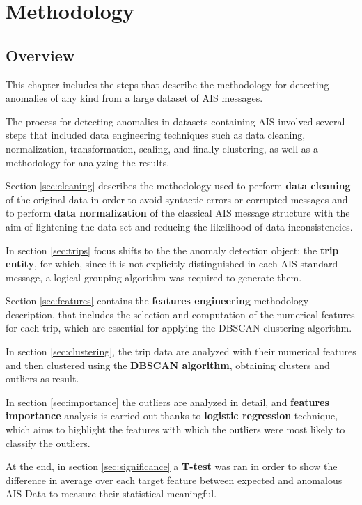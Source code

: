 \chapter{Methodology}
\label{ch:methodology}

\section{Overview}

This chapter includes the steps that describe the methodology for detecting anomalies of any kind from a large dataset of AIS messages.

The process for detecting anomalies in datasets containing AIS involved several steps that included data engineering techniques such as data cleaning, normalization, transformation, scaling, and finally clustering, as well as a methodology for analyzing the results.

Section \ref{sec:cleaning} describes the methodology used to perform \textbf{data cleaning} of the original data in order to avoid syntactic errors or corrupted messages and to perform \textbf{data normalization} of the classical AIS message structure with the aim of lightening the data set and reducing the likelihood of data inconsistencies.

In section \ref{sec:trips} focus shifts to the the anomaly detection object: the \textbf{trip entity}, for which, since it is not explicitly distinguished in each AIS standard message, a logical-grouping algorithm was required to generate them.

Section \ref{sec:features} contains the \textbf{features engineering} methodology description, that includes the selection and computation of the numerical features for each trip, which are essential for applying the DBSCAN clustering algorithm.

In section \ref{sec:clustering}, the trip data are analyzed with their numerical features and then clustered using the \textbf{DBSCAN algorithm}, obtaining clusters and outliers as result.

In section \ref{sec:importance} the outliers are analyzed in detail, and \textbf{features importance} analysis is carried out thanks to \textbf{logistic regression} technique, which aims to highlight the features with which the outliers were most likely to classify the outliers.

At the end, in section \ref{sec:significance} a \textbf{T-test} was ran in order to show the difference in average over each target feature between expected and anomalous AIS Data to measure their statistical meaningful.


